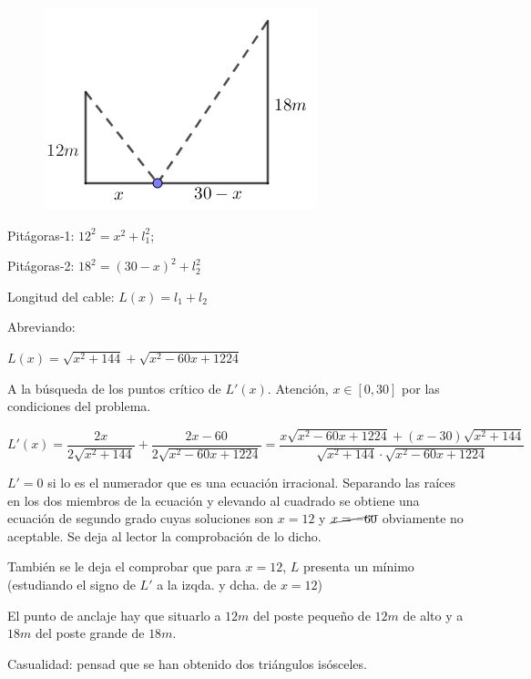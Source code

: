 	\begin{proofw}\renewcommand{\qedsymbol}{$\diamond$}
	
	
	\begin{multicols}{2}
	
	\begin{figure}[H]
	\centering
	\includegraphics[width=.35\textwidth]{imagenes/imagenes05/T05IM19.png}
	\end{figure}
	
	\hspace{6mm}Pitágoras-1: $12^2=x^2+l_1^2$; 
	
	Pitágoras-2: $18^2=(30-x)^2+l_2^2$
	
	Longitud del cable: $L(x)=l_1+l_2$
	
	Abreviando: 
	
	$L(x)= \sqrt{x^2+144}+ \sqrt{x^2-60x+1224}$
		
	\end{multicols}
	
	A la búsqueda de los puntos crítico de $L'(x)$. Atención, $x\in [0,30]$ por las condiciones del problema.
	
	$L'(x)= \dfrac {2x}{2\sqrt{x^2+144}} + \dfrac {2x-60}{2\sqrt{x^2-60x+1224}}= \dfrac {x\sqrt{x^2-60x+1224}+(x-30)\sqrt{x^2+144}}{\sqrt{x^2+144} \cdot \sqrt{x^2-60x+1224}}$
	
	$L'=0$ si lo es el numerador que es una ecuación irracional. Separando las raíces en los dos miembros de la ecuación y elevando al cuadrado se obtiene una ecuación de segundo grado cuyas soluciones son $x=12$ y $\cancel{x=-60}$ obviamente no aceptable.  Se deja al lector la comprobación de lo dicho.
	
	También se le deja el comprobar que para $x=12$, $L$ presenta un mínimo (estudiando el signo de $L'$ a la izqda. y dcha. de $x=12$)
	
	El punto de anclaje hay que situarlo a $12m$ del poste pequeño de $12m$ de alto y a $18m$ del poste grande de $18m$.
	
	\textcolor{gris}{Casualidad: pensad que se han obtenido dos triángulos isósceles.}
	
	\end{proofw}


